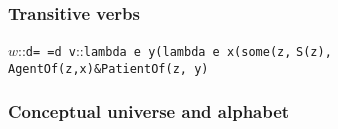 \documentclass[aspectratio=169]{beamer}
\newcommand{\lex}[3]{{#1}::{\texttt{#2}}::{#3}}
\begin{document}
%
\begin{frame}
  \frametitle{Transitive verbs}
\begin{center}
  \begin{footnotesize}
  \lex{$w$}{d=~=d~v}{\lstinline{lambda e y(lambda e x(some(z,}{\color{red} \lstinline{S}}\lstinline{(z), AgentOf(z,x)&PatientOf(z, y)}}
  \end{footnotesize}
\end{center}
\end{frame}
%
%
%
%
\begin{frame}
  \frametitle{Conceptual universe and alphabet}

\end{frame}
%
\end{document}
